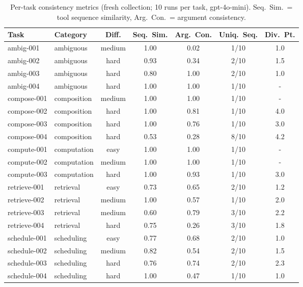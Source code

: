 \begin{table}[t]
\centering
\caption{Per-task consistency metrics (fresh collection; 10 runs per task,
gpt-4o-mini). Seq.\ Sim.\ = tool sequence similarity, Arg.\ Con.\ = argument
consistency.}
\label{tab:results}
\small
\begin{tabular}{llccccc}
\toprule
Task & Category & Diff. & Seq.\ Sim. & Arg.\ Con. & Uniq.\ Seq. & Div.\ Pt. \\
\midrule
ambig-001 & ambiguous & medium & 1.00 & 0.02 & 1/10 & 1.0 \\
ambig-002 & ambiguous & hard & 0.93 & 0.34 & 2/10 & 1.5 \\
ambig-003 & ambiguous & hard & 0.80 & 1.00 & 2/10 & 1.0 \\
ambig-004 & ambiguous & hard & 1.00 & 1.00 & 1/10 & - \\
compose-001 & composition & medium & 1.00 & 1.00 & 1/10 & - \\
compose-002 & composition & hard & 1.00 & 0.81 & 1/10 & 4.0 \\
compose-003 & composition & hard & 1.00 & 0.76 & 1/10 & 3.0 \\
compose-004 & composition & hard & 0.53 & 0.28 & 8/10 & 4.2 \\
compute-001 & computation & easy & 1.00 & 1.00 & 1/10 & - \\
compute-002 & computation & medium & 1.00 & 1.00 & 1/10 & - \\
compute-003 & computation & hard & 1.00 & 0.93 & 1/10 & 3.0 \\
retrieve-001 & retrieval & easy & 0.73 & 0.65 & 2/10 & 1.2 \\
retrieve-002 & retrieval & medium & 1.00 & 0.57 & 1/10 & 2.0 \\
retrieve-003 & retrieval & medium & 0.60 & 0.79 & 3/10 & 2.2 \\
retrieve-004 & retrieval & hard & 0.75 & 0.26 & 3/10 & 1.8 \\
schedule-001 & scheduling & easy & 0.77 & 0.68 & 2/10 & 1.0 \\
schedule-002 & scheduling & medium & 0.82 & 0.54 & 2/10 & 1.5 \\
schedule-003 & scheduling & hard & 0.76 & 0.74 & 2/10 & 2.3 \\
schedule-004 & scheduling & hard & 1.00 & 0.47 & 1/10 & 1.0 \\
\bottomrule
\end{tabular}
\end{table}
